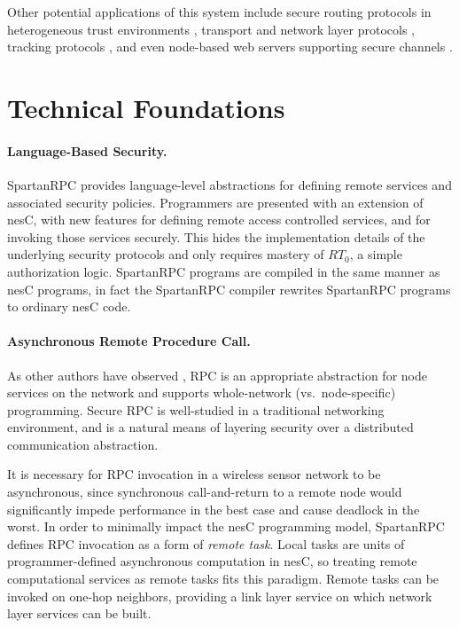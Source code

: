 Other potential applications of this system include secure routing protocols in heterogeneous
trust environments \cite{senroute-ahnj03}, transport and network layer protocols
\cite{perillo-heinzelman-2005}, tracking protocols \cite{brooks-ramanathan-sayeed-2003}, and
even node-based web servers supporting secure channels \cite{1049776}.

\section{Technical Foundations}

\paragraph{Language-Based Security.} SpartanRPC provides language-level abstractions for defining
remote services and associated security policies. Programmers are presented with an extension of
nesC, with new features for defining remote access controlled services, and for invoking those
services securely. This hides the implementation details of the underlying security protocols
and only requires mastery of $RT_0$, a simple authorization logic. SpartanRPC programs are
compiled in the same manner as nesC programs, in fact the SpartanRPC compiler rewrites
SpartanRPC programs to ordinary nesC code.

\paragraph{Asynchronous Remote Procedure Call.} As other authors have observed
\cite{may-tinyrpc-2007}, RPC is an appropriate abstraction for node services on the network and
supports whole-network (vs.~node-specific) programming. Secure RPC is well-studied in a
traditional networking environment, and is a natural means of layering security over a
distributed communication abstraction.

It is necessary for RPC invocation in a wireless sensor network to be asynchronous, since
synchronous call-and-return to a remote node would significantly impede performance in the best
case and cause deadlock in the worst. In order to minimally impact the nesC programming model,
SpartanRPC defines RPC invocation as a form of \emph{remote task}. Local tasks are units of
programmer-defined asynchronous computation in nesC, so treating remote computational services
as remote tasks fits this paradigm. Remote tasks can be invoked on one-hop neighbors, providing
a link layer service on which network layer services can be built.

